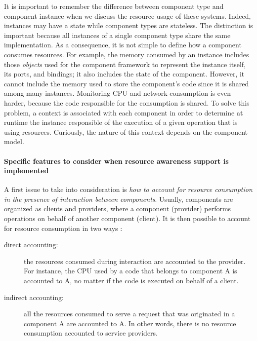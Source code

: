 It is important to remember the difference between component type and component instance when we discuss the resource usage of these systems.
Indeed, instances may have a state while component types are stateless.
The distinction is important because all instances of a single component type share the same implementation.
As a consequence, it is not simple to define how a component consumes resources.
For example, the memory consumed by an instance includes those \textit{objects} used for the component framework to represent the instance itself, its ports, and bindings; it also includes the state of the component. 
However, it cannot include the memory used to store the component's code since it is shared among many instances.
Monitoring CPU and network consumption is even harder, because the code responsible for the consumption is shared.
To solve this problem, a context is associated with each component in order to determine at runtime the instance responsible of the execution of a given operation that is using resources.
Curiously, the nature of this context depends on the component model.     

\paragraph{Specific features to consider when resource awareness support is implemented}

A first issue to take into consideration is \textit{how to account for resource consumption in the presence of interaction between components}.
Usually, components are organized as clients and providers, where a component (provider) performs operations on behalf of another component (client).
It is then possible to account for resource consumption in two ways \cite{Miettinen2008,Maurel:2012:AME:2304736.2304763}:

\begin{description}
\item[direct accounting:] the resources consumed during
interaction are accounted to the provider.
For instance, the CPU used by a code that belongs
to component A is accounted to A, no matter if the code is executed on behalf of a client.

\item[indirect accounting:] all the resources consumed to serve a request that was originated in a component A are accounted to A.
In other words, there is no resource consumption accounted to service providers.
\end{description}

